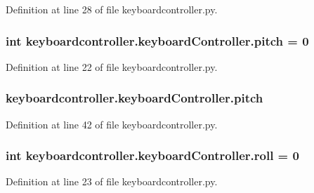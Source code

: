 Definition at line 28 of file keyboardcontroller.\-py.

\hypertarget{classkeyboardcontroller_1_1keyboardController_a5d118a68bd2e8980881aefc35f89250c}{
\subsubsection[{pitch}]{\setlength{\rightskip}{0pt plus 5cm}int keyboardcontroller.\-keyboard\-Controller.\-pitch = 0\hspace{0.3cm}{\ttfamily [static]}}}\label{classkeyboardcontroller_1_1keyboardController_a5d118a68bd2e8980881aefc35f89250c}


Definition at line 22 of file keyboardcontroller.\-py.

\hypertarget{classkeyboardcontroller_1_1keyboardController_a14f579accd5ea6498e009e4b7968956e}{
\subsubsection[{pitch}]{\setlength{\rightskip}{0pt plus 5cm}keyboardcontroller.\-keyboard\-Controller.\-pitch}}\label{classkeyboardcontroller_1_1keyboardController_a14f579accd5ea6498e009e4b7968956e}


Definition at line 42 of file keyboardcontroller.\-py.

\hypertarget{classkeyboardcontroller_1_1keyboardController_ae0594f85dbb7ce79348f2c7626aafd2f}{
\subsubsection[{roll}]{\setlength{\rightskip}{0pt plus 5cm}int keyboardcontroller.\-keyboard\-Controller.\-roll = 0\hspace{0.3cm}{\ttfamily [static]}}}\label{classkeyboardcontroller_1_1keyboardController_ae0594f85dbb7ce79348f2c7626aafd2f}


Definition at line 23 of file keyboardcontroller.\-py.

